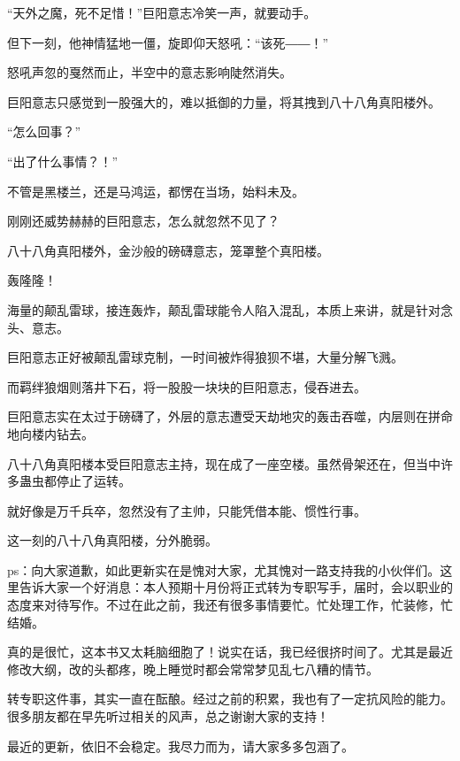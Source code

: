 \begin{this_body}
“天外之魔，死不足惜！”巨阳意志冷笑一声，就要动手。

但下一刻，他神情猛地一僵，旋即仰天怒吼：“该死――！”

怒吼声忽的戛然而止，半空中的意志影响陡然消失。

巨阳意志只感觉到一股强大的，难以抵御的力量，将其拽到八十八角真阳楼外。

“怎么回事？”

“出了什么事情？！”

不管是黑楼兰，还是马鸿运，都愣在当场，始料未及。

刚刚还威势赫赫的巨阳意志，怎么就忽然不见了？

八十八角真阳楼外，金沙般的磅礴意志，笼罩整个真阳楼。

轰隆隆！

海量的颠乱雷球，接连轰炸，颠乱雷球能令人陷入混乱，本质上来讲，就是针对念头、意志。

巨阳意志正好被颠乱雷球克制，一时间被炸得狼狈不堪，大量分解飞溅。

而羁绊狼烟则落井下石，将一股股一块块的巨阳意志，侵吞进去。

巨阳意志实在太过于磅礴了，外层的意志遭受天劫地灾的轰击吞噬，内层则在拼命地向楼内钻去。

八十八角真阳楼本受巨阳意志主持，现在成了一座空楼。虽然骨架还在，但当中许多蛊虫都停止了运转。

就好像是万千兵卒，忽然没有了主帅，只能凭借本能、惯性行事。

这一刻的八十八角真阳楼，分外脆弱。

ps：向大家道歉，如此更新实在是愧对大家，尤其愧对一路支持我的小伙伴们。这里告诉大家一个好消息：本人预期十月份将正式转为专职写手，届时，会以职业的态度来对待写作。不过在此之前，我还有很多事情要忙。忙处理工作，忙装修，忙结婚。

真的是很忙，这本书又太耗脑细胞了！说实在话，我已经很挤时间了。尤其是最近修改大纲，改的头都疼，晚上睡觉时都会常常梦见乱七八糟的情节。

转专职这件事，其实一直在酝酿。经过之前的积累，我也有了一定抗风险的能力。很多朋友都在早先听过相关的风声，总之谢谢大家的支持！

最近的更新，依旧不会稳定。我尽力而为，请大家多多包涵了。

\end{this_body}

